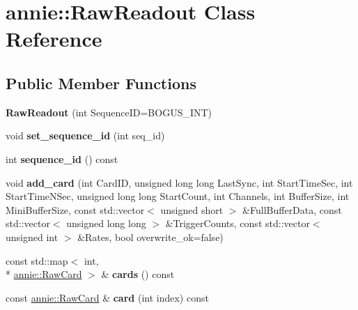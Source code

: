 \hypertarget{classannie_1_1RawReadout}{\section{annie\-:\-:Raw\-Readout Class Reference}
\label{classannie_1_1RawReadout}
}
\subsection*{Public Member Functions}
\begin{DoxyCompactItemize}
\item 
\hypertarget{classannie_1_1RawReadout_a66f3a9c85b9413f72c19486903cba555}{{\bfseries Raw\-Readout} (int Sequence\-I\-D=B\-O\-G\-U\-S\-\_\-\-I\-N\-T)}\label{classannie_1_1RawReadout_a66f3a9c85b9413f72c19486903cba555}

\item 
\hypertarget{classannie_1_1RawReadout_a50f260bfb7e4d0c432068b083bee0ade}{void {\bfseries set\-\_\-sequence\-\_\-id} (int seq\-\_\-id)}\label{classannie_1_1RawReadout_a50f260bfb7e4d0c432068b083bee0ade}

\item 
\hypertarget{classannie_1_1RawReadout_a00fa88e705b67adce1287addd44b5c39}{int {\bfseries sequence\-\_\-id} () const }\label{classannie_1_1RawReadout_a00fa88e705b67adce1287addd44b5c39}

\item 
\hypertarget{classannie_1_1RawReadout_a024f428f54d2aa60e3bb362a65fa52db}{void {\bfseries add\-\_\-card} (int Card\-I\-D, unsigned long long Last\-Sync, int Start\-Time\-Sec, int Start\-Time\-N\-Sec, unsigned long long Start\-Count, int Channels, int Buffer\-Size, int Mini\-Buffer\-Size, const std\-::vector$<$ unsigned short $>$ \&Full\-Buffer\-Data, const std\-::vector$<$ unsigned long long $>$ \&Trigger\-Counts, const std\-::vector$<$ unsigned int $>$ \&Rates, bool overwrite\-\_\-ok=false)}\label{classannie_1_1RawReadout_a024f428f54d2aa60e3bb362a65fa52db}

\item 
\hypertarget{classannie_1_1RawReadout_af5d43b02fbde95e9811a5dd02cdb259d}{const std\-::map$<$ int, \\*
\hyperlink{classannie_1_1RawCard}{annie\-::\-Raw\-Card} $>$ \& {\bfseries cards} () const }\label{classannie_1_1RawReadout_af5d43b02fbde95e9811a5dd02cdb259d}

\item 
\hypertarget{classannie_1_1RawReadout_a83511d054f76dfb88813d9bf6e916b9c}{const \hyperlink{classannie_1_1RawCard}{annie\-::\-Raw\-Card} \& {\bfseries card} (int index) const }\label{classannie_1_1RawReadout_a83511d054f76dfb88813d9bf6e916b9c}


\end{DoxyCompactItemize}
